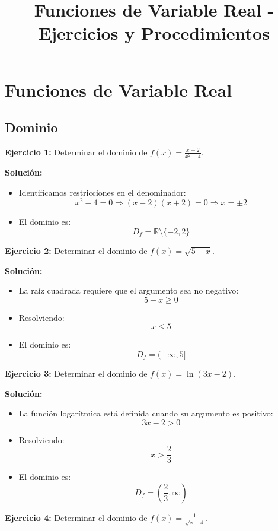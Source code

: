 \documentclass{profesor}
\title{Funciones de Variable Real - Ejercicios y Procedimientos}
\begin{document}
\maketitle
\tableofcontents
\newpage

\section{Funciones de Variable Real}

\subsection{Dominio}

\textbf{Ejercicio 1:} Determinar el dominio de \( f(x) = \frac{x+2}{x^2-4} \).

\textbf{Solución:}  
\begin{itemize}
    \item Identificamos restricciones en el denominador:
    \[
    x^2 - 4 = 0 \Rightarrow (x-2)(x+2) = 0 \Rightarrow x = \pm 2
    \]
    \item El dominio es:
    \[
    D_f = \mathbb{R} \setminus \{ -2, 2 \}
    \]
\end{itemize}

\textbf{Ejercicio 2:} Determinar el dominio de \( f(x) = \sqrt{5 - x} \).

\textbf{Solución:}  
\begin{itemize}
    \item La raíz cuadrada requiere que el argumento sea no negativo:
    \[
    5 - x \geq 0
    \]
    \item Resolviendo:
    \[
    x \leq 5
    \]
    \item El dominio es:
    \[
    D_f = (-\infty, 5]
    \]
\end{itemize}

\textbf{Ejercicio 3:} Determinar el dominio de \( f(x) = \ln(3x - 2) \).

\textbf{Solución:}  
\begin{itemize}
    \item La función logarítmica está definida cuando su argumento es positivo:
    \[
    3x - 2 > 0
    \]
    \item Resolviendo:
    \[
    x > \frac{2}{3}
    \]
    \item El dominio es:
    \[
    D_f = \left(\frac{2}{3}, \infty\right)
    \]
\end{itemize}

\textbf{Ejercicio 4:} Determinar el dominio de \( f(x) = \frac{1}{\sqrt{x-4}} \).
\end{document}
